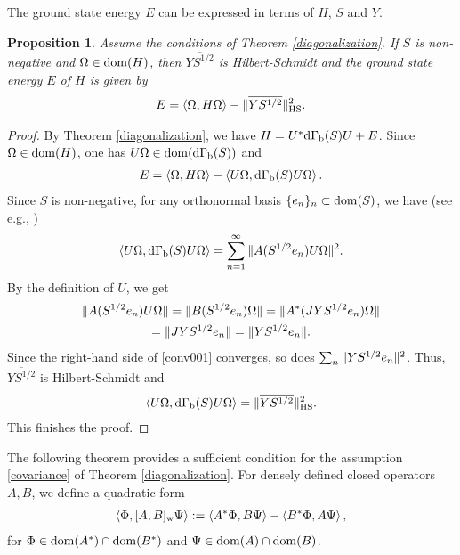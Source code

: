 \documentclass[12pt]{article}
\theoremstyle{plain}
\newtheorem{prop}[theorem]{\bf Proposition}
\numberwithin{equation}{section}
\theoremstyle{remark}
\begin{document}
The ground state energy $E$ can be expressed in terms of $H$, $S$ and $Y$.
\begin{prop}\label{gse1}
Assume the conditions of Theorem \ref{diagonalization}.
If $S$ is non-negative and $\Omega\in\mathop{\mathrm{dom}}(H)$, then $\overline{YS^{1/2}}$ is Hilbert-Schmidt and
the ground state energy $E$ of $H$ is given by 
 \begin{align*}
    E = \left\langle\Omega,H\Omega\right\rangle - \| \overline{YS^{1/2}} \|_\mathrm{HS}^2.
 \end{align*}
\end{prop}

\begin{proof}
By Theorem \ref{diagonalization}, we have $H=U^*\mathrm{d\Gamma_b}(S)U+E$.
Since $\Omega\in\mathop{\mathrm{dom}}(H)$, one has $U\Omega \in\mathop{\mathrm{dom}}(\mathrm{d\Gamma_b}(S))$ and 
\begin{align*}
 E = \left\langle\Omega,H\Omega\right\rangle - \left\langle U\Omega,\mathrm{d\Gamma_b}(S)U\Omega\right\rangle.
\end{align*}
Since $S$ is non-negative, for any orthonormal basis $\{e_n\}_n\subset \mathop{\mathrm{dom}}(S)$, we have (see e.g., \cite[Theorem 5.21]{A18})
\begin{align}
 \left\langle U\Omega,\mathrm{d\Gamma_b}(S)U\Omega\right\rangle 
 = \sum_{n=1}^\infty \| A(S^{1/2}e_n)U\Omega \|^2. \label{conv001}
\end{align}
By the definition of $U$, we get
\begin{multline*}
 \| A(S^{1/2}e_n)U\Omega \|
= \| B(S^{1/2}e_n)\Omega \|
 = \| A^*(JYS^{1/2}e_n)\Omega \|\\
 = \| JYS^{1/2}e_n \|
= \| YS^{1/2}e_n \|.
\end{multline*}
Since the right-hand side of \eqref{conv001} converges, so does $\sum_{n}\| YS^{1/2}e_n \|^2$.
Thus, $\overline{YS^{1/2}}$ is Hilbert-Schmidt and 
\begin{align*}
  \left\langle U\Omega,\mathrm{d\Gamma_b}(S)U\Omega\right\rangle = \| \overline{YS^{1/2}} \|_\mathrm{HS}^2.
\end{align*}
This finishes the proof.
\end{proof}

The following theorem provides a sufficient condition for the assumption \eqref{covariance} of Theorem \ref{diagonalization}.
For densely defined closed operators $A,B$, we define a quadratic form
\begin{align*}
  \left\langle\Phi,[A,B]_\mathrm{w}\Psi\right\rangle
 := \left\langle A^*\Phi,B\Psi\right\rangle-\left\langle B^*\Phi,A\Psi\right\rangle, 
\end{align*}
for $\Phi\in\mathop{\mathrm{dom}}(A^*)\cap \mathop{\mathrm{dom}}(B^*)$ and $\Psi\in\mathop{\mathrm{dom}}(A)\cap\mathop{\mathrm{dom}}(B)$.
\end{document}
